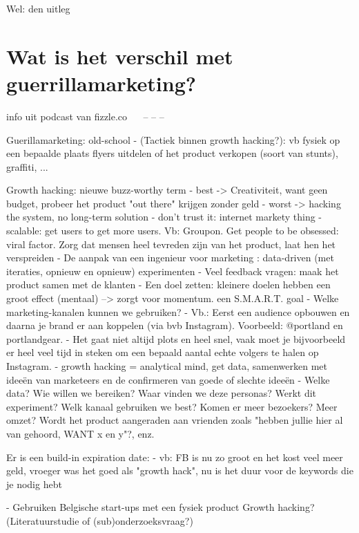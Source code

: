 Wel: den uitleg

\section{Wat is het verschil met guerrillamarketing?}
\label{sec:verschil-met-guerrillamarketing}

info uit podcast van fizzle.co
~~\autocite{fizzle.co2015}
 -- -- -- 

Guerillamarketing: old-school
- (Tactiek binnen growth hacking?): vb fysiek op een bepaalde plaats flyers uitdelen of het product verkopen (soort van stunts), graffiti, ...

Growth hacking: nieuwe buzz-worthy term
- best -> Creativiteit, want geen budget, probeer het product "out there" krijgen zonder geld
- worst -> hacking the system, no long-term solution
- don't trust it: internet markety thing
- scalable: get users to get more users. Vb: Groupon. Get people to be obsessed: viral factor. Zorg dat mensen heel tevreden zijn van het product, laat hen het verspreiden
- De aanpak van een ingenieur voor marketing : data-driven (met iteraties, opnieuw en opnieuw) experimenten
- Veel feedback vragen: maak het product samen met de klanten
- Een doel zetten: kleinere doelen hebben een groot effect (mentaal) --> zorgt voor momentum. een S.M.A.R.T. goal
- Welke marketing-kanalen kunnen we gebruiken?
- Vb.: Eerst een audience opbouwen en daarna je brand er aan koppelen (via bvb Instagram). Voorbeeld: @portland en portlandgear.
- Het gaat niet altijd plots en heel snel, vaak moet je bijvoorbeeld er heel veel tijd in steken om een bepaald aantal echte volgers te halen op Instagram. 
- growth hacking = analytical mind, get data, samenwerken met ideeën van marketeers en de confirmeren van goede of slechte ideeën
- Welke data? Wie willen we bereiken? Waar vinden we deze personas? Werkt dit experiment? Welk kanaal gebruiken we best? Komen er meer bezoekers? Meer omzet? Wordt het product aangeraden aan vrienden zoals "hebben jullie hier al van gehoord, WANT x en y"?, enz.


Er is een build-in expiration date:
- vb: FB is nu zo groot en het kost veel meer geld, vroeger was het goed als "growth hack", nu is het duur voor de keywords die je nodig hebt



- Gebruiken Belgische start-ups met een fysiek product Growth hacking? (Literatuurstudie of (sub)onderzoeksvraag?)

